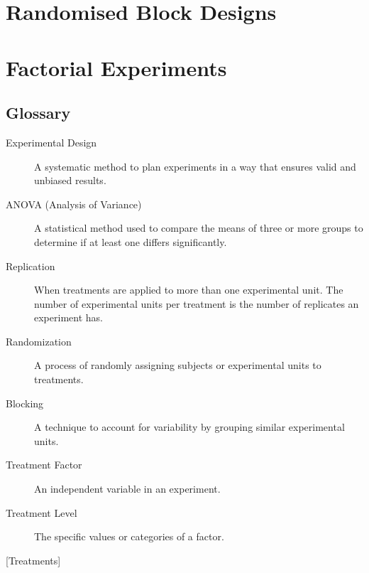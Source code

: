 \documentclass[
  letterpaper,
  DIV=11,
  numbers=noendperiod,
  oneside]{scrreprt}
\begin{document}
\part{Randomised Block Designs}

\part{Factorial Experiments}


\chapter*{Glossary}\label{glossary}


\begin{description}
\item[\label{glossary-experimental-design}{Experimental
Design}]
A systematic method to plan experiments in a way that ensures valid and
unbiased results.
\item[\label{glossary-anova-analysis-of-variance}{ANOVA
(Analysis of Variance)}]
A statistical method used to compare the means of three or more groups
to determine if at least one differs significantly.
\item[\label{glossary-replication}{Replication}]
When treatments are applied to more than one experimental unit. The
number of experimental units per treatment is the number of replicates
an experiment has.
\item[\label{glossary-randomization}{Randomization}]
A process of randomly assigning subjects or experimental units to
treatments.
\item[\label{glossary-blocking}{Blocking}]
A technique to account for variability by grouping similar experimental
units.
\item[\label{glossary-factor}{Treatment Factor}]
An independent variable in an experiment.
\item[\label{glossary-level}{Treatment Level}]
The specific values or categories of a factor.
\end{description}

{[}Treatments{]}
\end{document}
